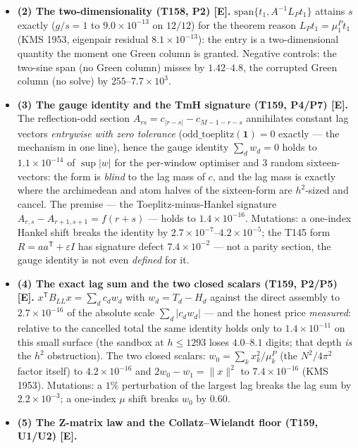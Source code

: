 \documentclass[11pt]{article}
\providecommand{\mE}{\textbf{[E]}}\providecommand{\mC}{\textbf{[C]}}
\begin{document}
\begin{itemize}[leftmargin=1.5em]
$h=254\ldots1393$, sandbox); mutation: a $5\%$ corruption of one off-diagonal entry
destroys positive definiteness --- the Cholesky \emph{refuses} on $12/12$.
\item \textbf{(2) The two-dimensionality (T158, P2) \mE.}
$\mathrm{span}\{t_1,A^{-1}L_Pt_1\}$ attains $s$ exactly ($g/s=1$ to $9.0\times10^{-13}$ on
$12/12$) for the theorem reason $L_Pt_1=\mu^P_1t_1$ (KMS 1953, eigenpair residual
$8.1\times10^{-13}$): the entry is a two-dimensional quantity the moment one Green column
is granted. Negative controls: the two-sine span (no Green column) misses by
$1.42$--$4.8$, the corrupted Green column (no solve) by $255$--$7.7\times10^{3}$.
\item \textbf{(3) The gauge identity and the TmH signature (T159, P4/P7) \mE.} The
reflection-odd section $A_{rs}=c_{|r-s|}-c_{M-1-r-s}$ annihilates constant lag vectors
\emph{entrywise with zero tolerance} ($\mathrm{odd\_toeplitz}(\mathbf 1)=0$ exactly ---
the mechanism in one line), hence the gauge identity $\sum_dw_d=0$ holds to
$1.1\times10^{-14}$ of $\sup|w|$ for the per-window optimiser and $3$ random
sixteen-vectors: the form is \emph{blind} to the lag mass of $c$, and the lag mass is
exactly where the archimedean and atom halves of the sixteen-form are $h^2$-sized and
cancel. The premise --- the Toeplitz-minus-Hankel signature $A_{r,s}-A_{r+1,s+1}=f(r+s)$
--- holds to $1.4\times10^{-16}$. Mutations: a one-index Hankel shift breaks the identity
by $2.7\times10^{-7}$--$4.2\times10^{-5}$; the T145 form $R=aa^{\mathsf T}+\varepsilon I$
has signature defect $7.4\times10^{-2}$ --- not a parity section, the gauge identity is
not even \emph{defined} for it.
\item \textbf{(4) The exact lag sum and the two closed scalars (T159, P2/P5) \mE.}
$x^{\mathsf T}B_{LL}x=\sum_dc_dw_d$ with $w_d=T_d-H_d$ against the direct assembly to
$2.7\times10^{-16}$ of the absolute scale $\sum_d|c_dw_d|$ --- and the honest price
\emph{measured}: relative to the cancelled total the same identity holds only to
$1.4\times10^{-11}$ on this small surface (the sandbox at $h\le1293$ loses $4.0$--$8.1$
digits; that depth \emph{is} the $h^2$ obstruction). The two closed scalars:
$w_0=\sum_kx_k^2/\mu^P_k$ (the $N^2/4\pi^2$ factor itself) to $4.2\times10^{-16}$ and
$2w_0-w_1=\|x\|^2$ to $7.4\times10^{-16}$ (KMS 1953). Mutations: a $1\%$ perturbation of
the largest lag breaks the lag sum by $2.2\times10^{-3}$; a one-index $\mu$ shift breaks
$w_0$ by $0.60$.
\item \textbf{(5) The Z-matrix law and the Collatz--Wielandt floor (T159, U1/U2) \mE.}

\end{itemize}
\end{document}
